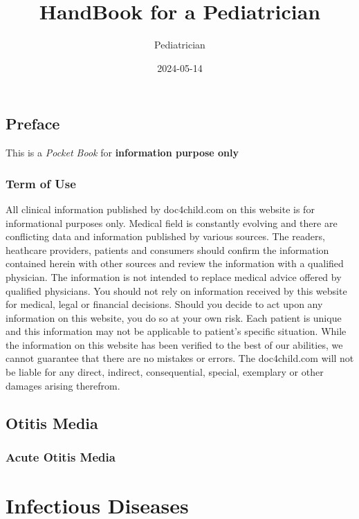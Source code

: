 \documentclass[
]{book}
\title{HandBook for a Pediatrician}
\author{Pediatrician}
\date{2024-05-14}
\begin{document}
\maketitle

{
\setcounter{tocdepth}{1}
\tableofcontents
}
\chapter*{Preface}\label{preface}

This is a \emph{Pocket Book} for \textbf{information purpose only}

\section*{Term of Use}\label{term-of-use}

All clinical information published by doc4child.com on this website is for informational purposes only. Medical field is constantly evolving and there are conflicting data and information published by various sources. The readers, heathcare providers, patients and consumers should confirm the information contained herein with other sources and review the information with a qualified physician. The information is not intended to replace medical advice offered by qualified physicians. You should not rely on information received by this website for medical, legal or financial decisions. Should you decide to act upon any information on this website, you do so at your own risk. Each patient is unique and this information may not be applicable to patient's specific situation. While the information on this website has been verified to the best of our abilities, we cannot guarantee that there are no mistakes or errors. The doc4child.com will not be liable for any direct, indirect, consequential, special, exemplary or other damages arising therefrom.

\chapter{Otitis Media}\label{OM}

\section{Acute Otitis Media}\label{AOM}

\part{Infectious Diseases}\label{part-infectious-diseases}
\end{document}
